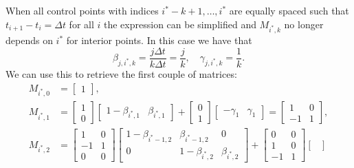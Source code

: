 When all control points with indices $i^* - k + 1, \ldots, i^*$ are equally spaced such that $t_{i+1} - t_i = \Delta t$ for all $i$ the expression can be simplified and $M_{i^*, k}$ no longer depends on $i^*$ for interior points. In this case we have that
\begin{equation}
  \beta_{j, i^*, k} = \frac{j \Delta t} {k \Delta t} = \frac{j}{k}, \quad \gamma_{j, i^*, k} = \frac{1}{k}.
\end{equation}
We can use this to retrieve the first couple of matrices:
\begin{subequations}
  \begin{align}
    M_{i^*, 0} & = \begin{bmatrix} 1 \end{bmatrix},                                                                                                                             \\
    M_{i^*, 1} & = \begin{bmatrix} 1 \\ 0 \end{bmatrix} \begin{bmatrix}
      1 - \beta_{i^*, 1} & \beta_{i^*, 1}
    \end{bmatrix} + \begin{bmatrix} 0 \\ 1 \end{bmatrix} \begin{bmatrix}
      - \gamma_{1} & \gamma_{1}
    \end{bmatrix} = \begin{bmatrix} 1 & 0 \\ -1 & 1 \end{bmatrix},             \\
    M_{i^*, 2} & = \begin{bmatrix}
      1 & 0 \\ -1 & 1 \\ 0 & 0
    \end{bmatrix} \begin{bmatrix}
      1 - \beta_{i^* - 1, 2} & \beta_{i^* - 1, 2} & 0              \\
      0                      & 1 - \beta_{i^*, 2} & \beta_{i^*, 2}
    \end{bmatrix} + \begin{bmatrix}
      0 & 0 \\ 1 & 0 \\ -1 & 1
    \end{bmatrix} \begin{bmatrix}

\end{bmatrix}
\end{align}
\end{subequations}
